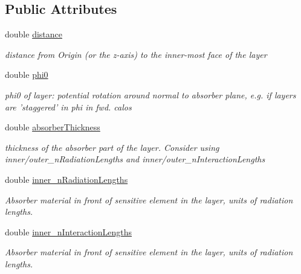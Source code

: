 \subsection*{Public Attributes}
\begin{DoxyCompactItemize}
\item 
double \hyperlink{struct_d_d4hep_1_1_d_d_rec_1_1_layered_calorimeter_struct_1_1_layer_a27ab51429cf061a2b184dc248402a10f}{distance}
\begin{DoxyCompactList}\small\item\em distance from Origin (or the z-\/axis) to the inner-\/most face of the layer \item\end{DoxyCompactList}\item 
double \hyperlink{struct_d_d4hep_1_1_d_d_rec_1_1_layered_calorimeter_struct_1_1_layer_aab79660830a8d520db2439c5a817f709}{phi0}
\begin{DoxyCompactList}\small\item\em phi0 of layer: potential rotation around normal to absorber plane, e.g. if layers are 'staggered' in phi in fwd. calos \item\end{DoxyCompactList}\item 
double \hyperlink{struct_d_d4hep_1_1_d_d_rec_1_1_layered_calorimeter_struct_1_1_layer_ad774498891dc9332c4edb5af822edca0}{absorberThickness}
\begin{DoxyCompactList}\small\item\em thickness of the absorber part of the layer. Consider using inner/outer\_\-nRadiationLengths and inner/outer\_\-nInteractionLengths \item\end{DoxyCompactList}\item 
double \hyperlink{struct_d_d4hep_1_1_d_d_rec_1_1_layered_calorimeter_struct_1_1_layer_aeb711a3f909969fd48ea8e3f6b67473b}{inner\_\-nRadiationLengths}
\begin{DoxyCompactList}\small\item\em Absorber material in front of sensitive element in the layer, units of radiation lengths. \item\end{DoxyCompactList}\item 
double \hyperlink{struct_d_d4hep_1_1_d_d_rec_1_1_layered_calorimeter_struct_1_1_layer_a096850bcaa7ae3e30b2c135cdcfc4502}{inner\_\-nInteractionLengths}
\begin{DoxyCompactList}\small\item\em Absorber material in front of sensitive element in the layer, units of radiation lengths. \item\end{DoxyCompactList}\item 

\end{DoxyCompactItemize}
